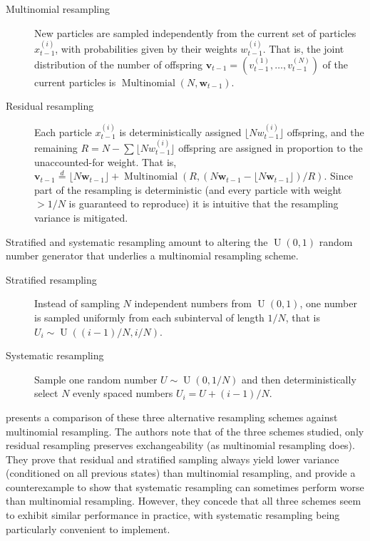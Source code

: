 \documentclass{article}
\newcommand{\eqdist}{\overset{d}{=}}
\begin{document}
\begin{description}
\item[Multinomial resampling] New particles are sampled independently from the current set of particles $x_{t-1}^{(i)}$, with probabilities given by their weights $w_{t-1}^{(i)}$. That is, the joint distribution of the number of offspring $\mathbf{v}_{t-1} = (v_{t-1}^{(1)},\dots,v_{t-1}^{(N)})$ of the current particles is $\operatorname{Multinomial}(N, \mathbf{w}_{t-1})$.
\item[Residual resampling] Each particle $x_{t-1}^{(i)}$ is deterministically assigned $\lfloor N w_{t-1}^{(i)} \rfloor$ offspring, and the remaining $R = N- \sum \lfloor N w_{t-1}^{(i)} \rfloor$ offspring are assigned in proportion to the unaccounted-for weight. That is, $\mathbf{v}_{t-1} \eqdist \lfloor N \mathbf{w}_{t-1} \rfloor +  \operatorname{Multinomial}(R, (N \mathbf{w}_{t-1} - \lfloor N \mathbf{w}_{t-1} \rfloor)/R)$. Since part of the resampling is deterministic (and every particle with weight $>1/N$ is guaranteed to reproduce) it is intuitive that the resampling variance is mitigated.
\end{description}
Stratified and systematic resampling amount to altering the $\operatorname{U}(0,1)$ random number generator that underlies a multinomial resampling scheme.
\begin{description}
\item[Stratified resampling] Instead of sampling $N$ independent numbers from $\operatorname{U}(0,1)$, one number is sampled uniformly from each subinterval of length $1/N$, that is $U_i \sim \operatorname{U}((i-1)/N, i/N)$.
\item[Systematic resampling] Sample one random number $U \sim \operatorname{U}(0,1/N)$ and then deterministically select $N$ evenly spaced numbers $U_i = U + (i-1)/N$.
\end{description}


\citet{douc2005} presents a comparison of these three alternative resampling schemes against multinomial resampling. The authors note that of the three schemes studied, only residual resampling preserves exchangeability (as multinomial resampling does). They prove that residual and stratified sampling always yield lower variance (conditioned on all previous states) than multinomial resampling, and provide a counterexample to show that systematic resampling can sometimes perform worse than multinomial resampling. However, they concede that all three schemes seem to exhibit similar performance in practice, with systematic resampling being particularly convenient to implement.
\end{document}
